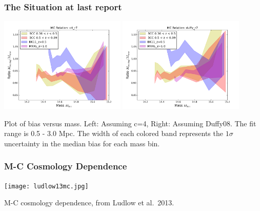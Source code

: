\documentclass{beamer}
\begin{document}

%




\begin{frame}
\frametitle{The Situation at last report}

\centering

\includegraphics[width=0.45\textwidth]{../figures/c4_r7}
\includegraphics[width=0.45\textwidth]{../figures/duffy_r7}

{\small Plot of bias versus mass. Left: Assuming c=4, Right: Assuming Duffy08. The fit range is 0.5 - 3.0 Mpc. The width of each colored band represents the $1\sigma$ uncertainty in the median bias for each mass bin.}





\end{frame}


\begin{frame}
\frametitle{M-C Cosmology Dependence}
\centering

\texttt{[image: ludlow13mc.jpg]}

\vspace{-25pt}

{\tiny M-C cosmology dependence, from Ludlow et al.\ 2013.}


\end{frame}
\end{document}
